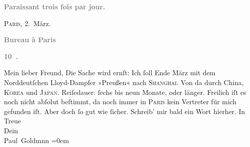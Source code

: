 \begin{ledgroupsized}[t]{13cm}
           \pstart
           \begin{otherlanguage}{french}\textcolor{gray}{\textbf{\textbf{Paraissant trois fois par jour.}}}\end{otherlanguage}\hfill \textsc{Paris}, 2. März.\pend
           \pstart
           \begin{otherlanguage}{french}\textcolor{gray}{\textbf{\textbf{Bureau à Paris}}}\end{otherlanguage}\pend
           \pstart
           \begin{otherlanguage}{french}\textcolor{gray}{\textbf{\textbf{10 .}}}\end{otherlanguage}\pend
           \pstart\center{}Mein lieber Freund,\pend\pstart
           Die Sache wird ernſt: Ich ſoll Ende März mit dem Norddeutſchen Lloyd-Dampfer »Preußen« nach \textsc{Shanghai}. Von da durch China, \textsc{Korea} und \textsc{Japan}. Reiſedauer: ſechs bis neun Monate, oder länger. Freilich iſt es noch nicht
               abſolut beſtimmt, da noch immer in \textsc{Paris} kein Vertreter für mich gefunden iſt. Aber doch ſo gut wie ſicher. Schreib’ mir
               bald ein Wort hierher.\pend
           \pstart
           In Treue {\\[\baselineskip]}Dein {\\[\baselineskip]}\spacefill\mbox{Paul Goldmnn}\pend
           \leftskip=0em{}
         
         \endnumbering{}\end{ledgroupsized}  \newcommand{\dateiname}{L02840}\newcommand{\titel}{Paul Goldmann an Arthur Schnitzler, 2. 3. [1898]}\newcommand{\editorInnen}{Martin Anton Müller und Laura Untner}
      